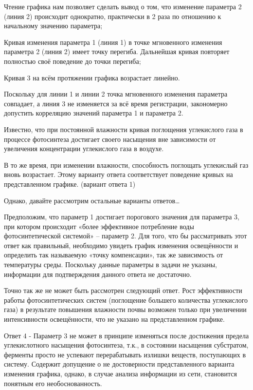 \explanationSection

Чтение графика нам позволяет сделать вывод о том, что изменение параметра 2 (линия 2) происходит однократно, практически в 2 раза по отношению к начальному значению параметра; 

Кривая изменения параметра 1 (линия 1) в точке мгновенного изменения параметра 2 (линия 2) имеет точку перегиба. Дальнейшая кривая повторяет полностью своё поведение до точки перегиба;

Кривая 3 на всём протяжении графика возрастает линейно.

Поскольку для линии 1 и линии 2 точка мгновенного изменения параметра совпадает, а линия 3 не изменяется за всё время регистрации, закономерно допустить корреляцию значений параметра 1  и параметра 2. 

Известно, что при постоянной влажности кривая поглощения углекислого газа в процессе фотосинтеза достигает своего насыщения вне зависимости от увеличения концентрации углекислого газа в воздухе. 

В то же время, при изменении влажности, способность поглощать углекислый газ вновь возрастает. Этому варианту ответа соответствует поведение кривых на представленном графике. (вариант ответа 1)

Однако, давайте рассмотрим остальные варианты ответов…

Предположим, что параметр 1 достигает порогового значения для параметра 3, при котором происходит «более эффективное потребление воды фотосинтетической системой» – параметр 2. Для того, что бы рассматривать этот ответ как правильный, необходимо увидеть график изменения освещённости и определить так называемую «точку компенсации», так же зависимость от температуры среды. Поскольку данные параметры в задачи не указаны, информации для подтверждения данного ответа не достаточно.

Точно так же не может быть рассмотрен следующий ответ. Рост эффективности работы фотосинтетических систем (поглощение большего количества углекислого газа) в результате повышения влажности почвы возможен только при увеличении интенсивности освещённости, что не указано на представленном графике.

Ответ 4 -  Параметр 3 не может в принципе изменяться после достижения предела углекислотного насыщения фотосинтеза, т.к., в состоянии насыщения субстратом, ферменты просто не успевают перерабатывать излишки веществ, поступающих в систему. Содержит допущение о не достоверности представленного варианта изменения графика, однако, в случае анализа информации из сети, становится понятным его необоснованность.

